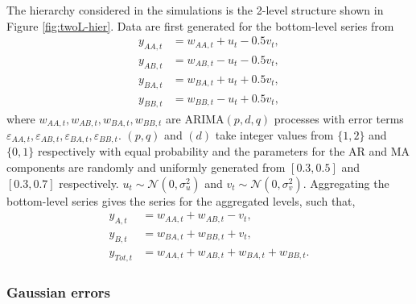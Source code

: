 \documentclass[12pt]{article}
\theoremstyle{definition}
\begin{document}
The hierarchy considered in the simulations is the 2-level structure shown in Figure \ref{fig:twoL-hier}. Data are first generated for the bottom-level series from
\begin{align*}
y_{AA,t} &= w_{AA,t} + u_t - 0.5v_t,\\
y_{AB,t} &= w_{AB,t} - u_t - 0.5v_t,\\
y_{BA,t} &= w_{BA,t} + u_t + 0.5v_t,\\
y_{BB,t} &= w_{BB,t} - u_t + 0.5v_t,
\end{align*}
where $w_{AA,t},w_{AB,t},w_{BA,t},w_{BB,t}$ are ARIMA$(p,d,q)$ processes with error terms \linebreak $\varepsilon_{AA,t},\varepsilon_{AB,t},\varepsilon_{BA,t},\varepsilon_{BB,t}$. $(p,q)$ and $(d)$ take integer values from $\{1,2\}$ and $\{0,1\}$ respectively with equal probability and the parameters for the AR and MA components are randomly and uniformly generated from $[0.3,0.5]$ and $[0.3,0.7]$ respectively. $u_t \sim \mathcal{N}(0,\sigma^2_u)$ and $v_t \sim \mathcal{N}(0,\sigma^2_v)$. Aggregating the bottom-level series gives the series for the aggregated levels, such that,
\begin{align*}
y_{A,t} &= w_{AA,t} + w_{AB,t} - v_t,\\
y_{B,t} &= w_{BA,t} + w_{BB,t} + v_t,\\
y_{Tot,t} &= w_{AA,t} + w_{AB,t} + w_{BA,t} + w_{BB,t}.
\end{align*}


\subsubsection*{Gaussian errors}
\end{document}
